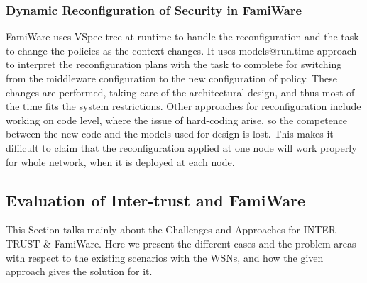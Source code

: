 \documentclass[12pt,a4paper,twoside]{report}
\begin{document}
\subsubsection{Dynamic Reconfiguration of Security in FamiWare}
FamiWare uses VSpec tree at runtime to handle the reconfiguration and the task to change the policies as the context changes. It uses models@run.time \cite{blair;bencomo:2009} approach to interpret the reconfiguration plans with the task to complete for switching from the middleware configuration to the new configuration of policy. These changes are performed, taking care of the architectural design, and thus most of the time fits the system restrictions. Other approaches for reconfiguration include working on code level, where the issue of hard-coding arise, so the competence between the new code and the models used for design is lost. This makes it difficult to claim that the reconfiguration applied at one node will work properly for whole network, when it is deployed at each node.\par

\subsection{Evaluation of Inter-trust and FamiWare}
This Section talks mainly about the Challenges and Approaches for INTER-TRUST \& FamiWare. Here we present the different cases and the problem areas with respect to the existing scenarios with the WSNs, and how the given approach gives the solution for it.
\end{document}

